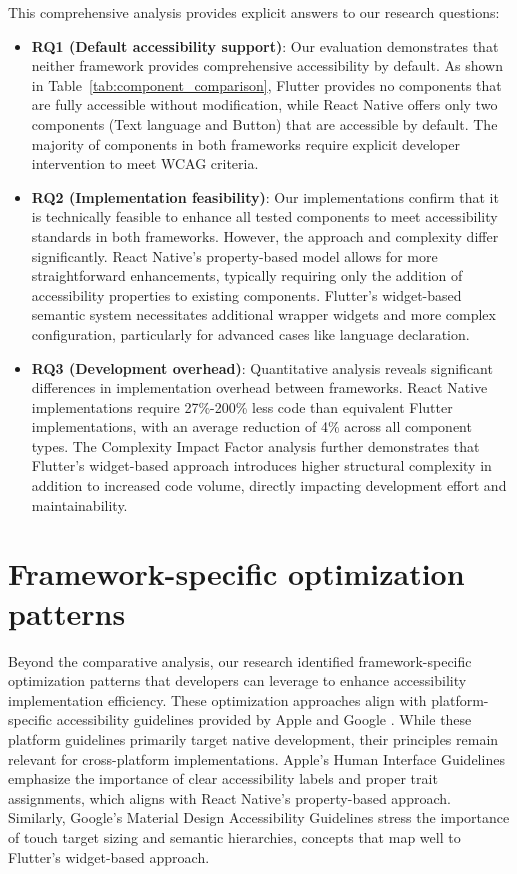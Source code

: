 {This comprehensive analysis provides explicit answers to our research questions:

\begin{itemize}
    \item \textbf{RQ1 (Default accessibility support)}: Our evaluation demonstrates that neither framework provides comprehensive accessibility by default. As shown in Table~\ref{tab:component_comparison}, Flutter provides no components that are fully accessible without modification, while React Native offers only two components (Text language and Button) that are accessible by default. The majority of components in both frameworks require explicit developer intervention to meet WCAG criteria.

    \item \textbf{RQ2 (Implementation feasibility)}: Our implementations confirm that it is technically feasible to enhance all tested components to meet accessibility standards in both frameworks. However, the approach and complexity differ significantly. React Native's property-based model allows for more straightforward enhancements, typically requiring only the addition of accessibility properties to existing components. Flutter's widget-based semantic system necessitates additional wrapper widgets and more complex configuration, particularly for advanced cases like language declaration.

    \item \textbf{RQ3 (Development overhead)}: Quantitative analysis reveals significant differences in implementation overhead between frameworks. React Native implementations require 27\%-200\% less code than equivalent Flutter implementations, with an average reduction of 4\% across all component types. The Complexity Impact Factor analysis further demonstrates that Flutter's widget-based approach introduces higher structural complexity in addition to increased code volume, directly impacting development effort and maintainability.
\end{itemize}

\section{Framework-specific optimization patterns}
\label{sec:optimization-patterns}

Beyond the comparative analysis, our research identified framework-specific optimization patterns that developers can leverage to enhance accessibility implementation efficiency. 
These optimization approaches align with platform-specific accessibility guidelines provided by Apple \cite{apple-accessibility} and Google \cite{google-accessibility}. While these platform guidelines primarily target native development, their principles remain relevant for cross-platform implementations. Apple's Human Interface Guidelines emphasize the importance of clear accessibility labels and proper trait assignments, which aligns with React Native's property-based approach. Similarly, Google's Material Design Accessibility Guidelines stress the importance of touch target sizing and semantic hierarchies, concepts that map well to Flutter's widget-based approach.

}
